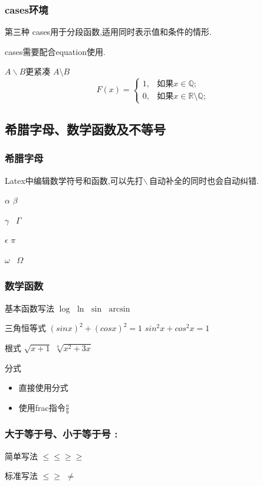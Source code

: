 \documentclass[12pt]{ctexart}
\begin{document}
\subsubsection{cases环境}
\par 第三种
cases用于分段函数,适用同时表示值和条件的情形.\par
cases需要配合equation使用.\par
$A \backslash B$更紧凑\quad
$A \setminus B$
\begin{equation}
	F(x) =
	\begin{cases}
		1,& \text{如果} x \in \mathbb{Q};	\\
		0,& \text{如果} x \in \mathbb{R} \setminus \mathbb{Q};	
	\end{cases}
\end{equation}


\subsection{希腊字母、数学函数及不等号}
\subsubsection{希腊字母}
Latex中编辑数学符号和函数,可以先打$\backslash$\,自动补全的同时也会自动纠错.

$\alpha$
$\beta$
\par
$\gamma$ \ $\Gamma$
\par
$\epsilon$
$\pi$
\par
$\omega$ \ $\Omega$

\subsubsection{数学函数}
基本函数写法
$\log$ \quad $\ln$ \quad $\sin$ \quad $\arcsin$

三角恒等式
$(sinx)^2+(cosx)^2=1$ \quad $sin^{2}x+cos^{2}x=1$

根式
$\sqrt{x+1}$ \quad $\sqrt[4]{x^2+3x}$

分式
\begin{itemize}
	\item 直接使用分式
	\item 使用frac指令\quad $\frac{a}{b}$
\end{itemize}

\subsubsection{大于等于号、小于等于号 :}
\par 简单写法 \quad $ \le \leq \ge \geq $ \\
\par 标准写法 \quad 
$\leqslant \geqslant$
$\neq$
\end{document}

